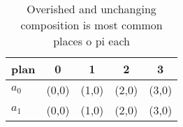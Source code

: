 \documentclass[a4paper]{article}
\begin{document}
\begin{table}
\begin{adjustbox}{width=0.5\columnwidth}
\begin{tabular}{|l|l|l|l|l|}
\hline
\textbf{plan} & \multicolumn{1}{c|}{\textbf{0}} & \multicolumn{1}{c|}{\textbf{1}} & \multicolumn{1}{c|}{\textbf{2}} & \multicolumn{1}{c|}{\textbf{3}} \\ \hline
\textbf{$a_0$}  & (0,0) & (1,0) & (2,0) & (3,0) \\ \hline
\textbf{$a_1$}  & (0,0) & (1,0) & (2,0) & (3,0) \\ \hline
\end{tabular}
\end{adjustbox}
\caption{Overished and unchanging composition is most common places o pi each 
}
\end{table}
\end{document}
